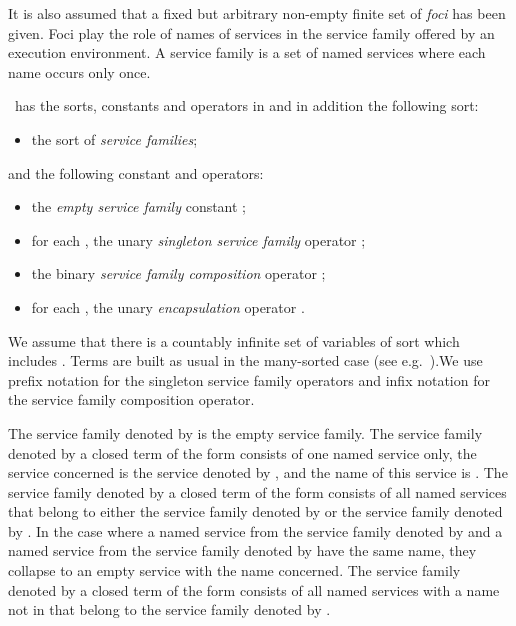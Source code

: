 \documentclass[fleqn]{llncs}
\begin{document}
It is also assumed that a fixed but arbitrary non-empty finite set
 of \emph{foci} has been given.
Foci play the role of names of services in the service family offered by
an execution environment.
A service family is a set of named services where each name occurs only
once.

\SFA\ has the sorts, constants and operators in 
and in addition the following sort:
\begin{itemize}
\item
the sort  of \emph{service families};
\end{itemize}
and the following constant and operators:
\begin{itemize}
\item
the \emph{empty service family} constant ;
\item
for each , the unary \emph{singleton service family}
operator ;
\item
the binary \emph{service family composition} operator
;
\item
for each , the unary \emph{encapsulation} operator
.
\end{itemize}
We assume that there is a countably infinite set of variables of sort
 which includes .
Terms are built as usual in the many-sorted case
(see e.g.~\cite{ST99a,Wir90a}).\linebreak[2]
We use prefix notation for the singleton service family operators and
infix nota\-tion for the service family composition operator.

The service family denoted by  is the empty service family.
The service family denoted by a closed term of the form  consists
of one named service only, the service concerned is the service denoted
by , and the name of this service is .
The service family denoted by a closed term of the form 
consists of all named services that belong to either the service family
denoted by  or the service family denoted by .
In the case where a named service from the service family denoted by 
and a named service from the service family denoted by  have the same
name, they collapse to an empty service with the name concerned.
The service family denoted by a closed term of the form 
consists of all named services with a name not in  that belong to the
service family denoted by .
\end{document}
